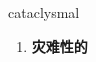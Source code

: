 
\begin{frame}
{\huge cataclysmal}
\begin{center}
\begin{enumerate}\Large
  \item \textbf{灾难性的}
\end{enumerate}
\end{center}
\end{frame}
